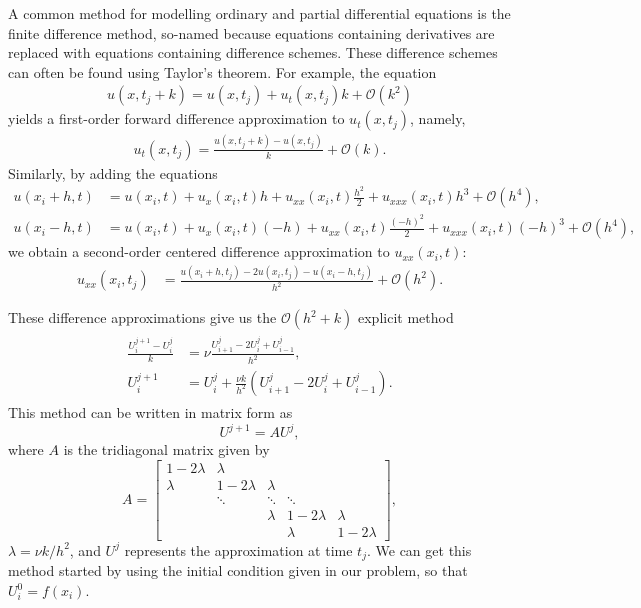 A common method for modelling ordinary and partial differential equations is the finite difference method, so-named because equations containing derivatives are replaced with equations containing difference schemes. These difference schemes can often be found using Taylor's theorem. For example, the equation 
\begin{align*}
	u(x,t_j + k) = u(x,t_j) + u_t(x,t_j)k + \mathcal{O}(k^2)
\end{align*}
yields a first-order forward difference approximation to $u_t(x,t_j)$, namely, 
\begin{align*}
	u_t(x,t_j ) = \frac{u(x,t_j+k) - u(x,t_j)}{k} + \mathcal{O}(k).
\end{align*}
Similarly, by adding the equations 
\begin{align*}
	u(x_i+h,t) &= u(x_i,t) + u_x(x_i,t)h + u_{xx}(x_i,t)\frac{h^2}{2} + u_{xxx}(x_i,t)h^3 + \mathcal{O}(h^4),\\
		u(x_i-h,t) &= u(x_i,t) + u_x(x_i,t)(-h) + u_{xx}(x_i,t)\frac{(-h)^2}{2} + u_{xxx}(x_i,t)(-h)^3 + \mathcal{O}(h^4),
\end{align*}
we obtain a second-order centered difference approximation to $u_{xx}(x_i,t)$:
\begin{align*}
	u_{xx}(x_i,t_j) &= \frac{u(x_i + h,t_j )-2 u(x_i,t_j)- u(x_i - h,t_j)}{h^2} + \mathcal{O}(h^2).
\end{align*}


These difference approximations give us the $\mathcal{O}(h^2 + k)$ explicit method 
\begin{align}
	\begin{split}
	\frac{U_{i}^{j+1} - U_{i}^{j}}{k} &= \nu \frac{U_{i+1}^{j}- 2U_{i}^{j} + U_{i-1}^{j} }{h^2} ,\\ 
	U_{i}^{j+1} &= U_{i}^{j} + \frac{\nu k}{h^2} (U_{i+1}^{j}- 2U_{i}^{j} + U_{i-1}^{j} ). 
	\end{split}\label{firstorder_explicit}
\end{align}
This method can be written in matrix form as 
\[
U^{j+1} = A U^j,
\]
where $A$ is the tridiagonal matrix given by 
\[
A = \left[\begin{array}{cccccc}1-2\lambda & \lambda &  &  &   \\ \lambda & 1-2\lambda & \lambda &  &   \\  & \ddots & \ddots & \ddots &  \\  &  & \lambda & 1-2\lambda & \lambda \\  &  &  & \lambda & 1-2\lambda\end{array}\right],
\]
$\lambda = \nu k/h^2$, and $U^j$ represents the approximation at time $t_j$. We can get this method started by using the initial condition given in our problem, so that $U_{i}^{0} = f(x_i)$. 

